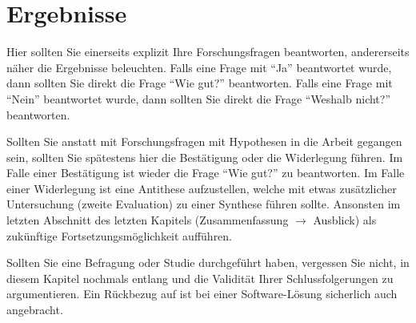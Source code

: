 \chapter{Ergebnisse}\label{chap:Results}
Hier sollten Sie einerseits explizit Ihre Forschungsfragen beantworten, andererseits näher die Ergebnisse beleuchten. Falls eine Frage mit \enquote{Ja} beantwortet wurde, dann sollten Sie direkt die Frage \enquote{Wie gut?} beantworten. Falls eine Frage mit \enquote{Nein} beantwortet wurde, dann sollten Sie direkt die Frage \enquote{Weshalb nicht?} beantworten.

Sollten Sie anstatt mit Forschungsfragen mit Hypothesen in die Arbeit gegangen sein, sollten Sie spätestens hier die Bestätigung oder die Widerlegung führen. Im Falle einer Bestätigung ist wieder die Frage \enquote{Wie gut?} zu beantworten. Im Falle einer Widerlegung ist eine Antithese aufzustellen, welche mit etwas zusätzlicher Untersuchung (zweite Evaluation) zu einer Synthese führen sollte. Ansonsten im letzten Abschnitt des letzten Kapitels (Zusammenfassung $\rightarrow$ Ausblick) als zukünftige Fortsetzungsmöglichkeit aufführen.

Sollten Sie eine Befragung oder Studie durchgeführt haben, vergessen Sie nicht, in diesem Kapitel nochmals entlang \cite{nielsen1990} und \cite{nielsen1994} die Validität Ihrer Schlussfolgerungen zu argumentieren. Ein Rückbezug auf \cite{sommerville1992} ist bei einer Software-Lösung sicherlich auch angebracht.